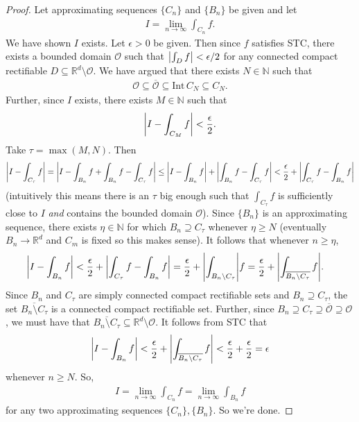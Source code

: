 \documentclass{article}
\theoremstyle{definition}
\newcommand{\f}[2]{\frac{#1}{#2}}
\begin{document}
\begin{proof}
    Let approximating sequences $\{C_n \}$ and $\{ B_n \}$ be given and let 
    \begin{align*}
        I = \lim_{n\to\infty} \int_{C_n}f.
    \end{align*}
    We have shown $I$ exists. Let $\epsilon > 0$ be given. Then since $f$ satisfies STC, there exists a bounded domain $\mathcal{O}$ such that $\abs{\int_{D} f} < \epsilon/2$ for any connected compact rectifiable $D \subseteq \mathbb{R}^d\setminus \mathcal{O}$. We have argued that there exists $N \in \mathbb{N}$ such that
    \begin{align*}
        \mathcal{O} \subseteq \overline{\mathcal{O}} \subseteq \mbox{Int}\,C_N \subseteq C_N.
    \end{align*}
    Further, since $I$ exists, there exists $M\in \mathbb{N}$ such that
    \begin{align*}
        \abs{I - \int_{C_M} f} < \f{\epsilon}{2}.
    \end{align*}
    Take $\tau = \max(M,N)$. Then
    \begin{align*}
        \abs{I - \int_{C_\tau} f} 
        = \abs{I - \int_{B_n} f + \int_{B_n} f - \int_{C_\tau} f } \leq \abs{I - \int_{B_n} f} + \abs{\int_{B_n} f - \int_{C_\tau} f}< \f{\epsilon}{2} + \abs{\int_{C_\tau}f - \int_{B_n} f}
    \end{align*}
    (intuitively this means there is an $\tau$ big enough such that $\int_{C_\tau} f$ is sufficiently close to $I$ \textit{and} contains the bounded domain $\mathcal{O}$). Since $\{ B_n \}$ is an approximating sequence, there exists $\eta \in \mathbb{N}$ for which $B_n \supseteq C_\tau$ whenever $\eta \geq N$ (eventually $B_n \to \mathbb{R}^d$ and $C_m$ is fixed so this makes sense). It follows that whenever $n \geq \eta$,
    \begin{align*}
        \abs{I - \int_{B_n} f} &< \f{\epsilon}{2} + \abs{\int_{C_\tau}f - \int_{B_n} f}= \f{\epsilon}{2} + \abs{\int_{B_n\setminus C_\tau}} f= \f{\epsilon}{2} + \abs{\int_{\overline{B_n\setminus C_\tau}} f}.
    \end{align*}
    Since $B_n$ and $C_\tau$ are simply connected compact rectifiable sets and $B_n\supseteq C_\tau$, the set $\overline{B_n \setminus C_\tau}$ is a connected compact rectifiable set. Further, since $B_n \supseteq C_\tau \supseteq \overline{\mathcal{O}} \supseteq \mathcal{O}$, we must have that $\overline{B_n\setminus C_\tau} \subseteq \mathbb{R}^d\setminus \mathcal{O}$. It follows from STC that
    \begin{align*}
        \abs{I - \int_{B_n} f} < \f{\epsilon}{2} + \abs{\int_{\overline{B_n\setminus C_\tau}} f} < \f{\epsilon}{2} + \f{\epsilon}{2} = \epsilon
    \end{align*}
    whenever $n \geq N$. So, 
    \begin{align*}
        I = \lim_{n\to \infty}\int_{C_n}f = \lim_{n\to \infty}\int_{B_n}f
    \end{align*}
    for any two approximating sequences $\{C_n \}, \{B_n \}$. So we're done.
\end{proof}
\end{document}
